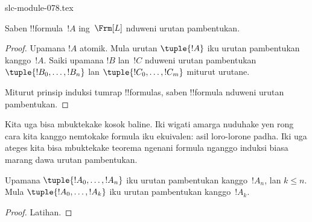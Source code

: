 \begin{filecontents*}[overwrite]{slc-module-078.tex}
\begin{prop}
Saben !!{formula}~$!A$ ing~$\Frm[L]$ nduweni urutan pambentukan.
\end{prop}

\begin{proof}
Upamana $!A$ atomik. Mula urutan $\tuple{!A}$ iku
urutan pambentukan kanggo~$!A$.
%
Saiki upamana $!B$ lan~$!C$ nduweni urutan pambentukan
$\tuple{!B_0,\dotsc,!B_n}$ lan $\tuple{!C_0,\dotsc,!C_m}$
miturut urutane.
%
\begin{enumerate}
\end{enumerate}
Miturut prinsip induksi tumrap !!{formula}s,
saben !!{formula} nduweni urutan pambentukan.
\end{proof}

Kita uga bisa mbuktekake kosok baline. Iki wigati amarga nuduhake
yen rong cara kita kanggo nemtokake formula iku ekuivalen: asil
loro-lorone padha. Iki uga ateges kita bisa mbuktekake teorema
ngenani formula nganggo induksi biasa marang dawa urutan pambentukan.

\begin{lem}
Upamana $\tuple{!A_0,\dotsc,!A_n}$ iku urutan pambentukan
kanggo~$!A_n$, lan $k \leq n$. Mula $\tuple{!A_0,\dotsc,!A_k}$
iku urutan pambentukan kanggo~$!A_k$.
\end{lem}

\begin{proof}
Latihan.
\end{proof}


\end{filecontents*}
